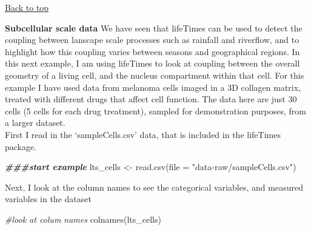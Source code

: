 \documentclass[
]{article}
\newenvironment{Shaded}{\begin{snugshade}}{\end{snugshade}}
\newcommand{\AttributeTok}[1]{\textcolor[rgb]{0.77,0.63,0.00}{#1}}
\newcommand{\CommentTok}[1]{\textcolor[rgb]{0.56,0.35,0.01}{\textit{#1}}}
\newcommand{\DocumentationTok}[1]{\textcolor[rgb]{0.56,0.35,0.01}{\textbf{\textit{#1}}}}
\newcommand{\FunctionTok}[1]{\textcolor[rgb]{0.00,0.00,0.00}{#1}}
\newcommand{\NormalTok}[1]{#1}
\newcommand{\OtherTok}[1]{\textcolor[rgb]{0.56,0.35,0.01}{#1}}
\newcommand{\StringTok}[1]{\textcolor[rgb]{0.31,0.60,0.02}{#1}}
\begin{document}
\protect\hyperlink{}{Back to top}

\textbf{Subcellular scale data} We have seen that lifeTimes can be used
to detect the coupling between lanscape scale processes such as rainfall
and riverflow, and to highlight how this coupling varies between seasons
and geographical regions. In this next example, I am using lifeTimes to
look at coupling between the overall geometry of a living cell, and the
nucleus compartment within that cell. For this example I have used data
from melanoma cells imaged in a 3D collagen matrix, treated with
different drugs that affect cell function. The data here are just 30
cells (5 cells for each drug treatment), sampled for demonstration
purposes, from a larger dataset.\\

First I read in the `sampleCells.csv' data, that is included in the
lifeTimes package.

\begin{Shaded}
\begin{Highlighting}[]
\DocumentationTok{\#\#\#start example}
\NormalTok{lts\_cells }\OtherTok{\textless{}{-}} \FunctionTok{read.csv}\NormalTok{(}\AttributeTok{file =} \StringTok{"data{-}raw/sampleCells.csv"}\NormalTok{)}
\end{Highlighting}
\end{Shaded}

Next, I look at the column names to see the categorical variables, and
measured variables in the dataset

\begin{Shaded}
\begin{Highlighting}[]
\CommentTok{\#look at colum names}
\FunctionTok{colnames}\NormalTok{(lts\_cells)}
\end{Highlighting}
\end{Shaded}
\end{document}
